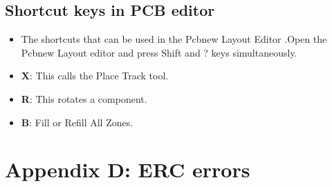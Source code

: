 \subsection{ Shortcut keys in PCB editor}

\begin {itemize}
\item The shortcuts that can be used in the Pcbnew Layout Editor .Open the Pcbnew Layout editor and press Shift and ? keys simultaneously.

\item {\textbf{X}}: This calls the Place Track tool. 
\item {\textbf{R}}: This rotates a component. 
\item{\textbf{B}}: Fill or Refill All Zones. 

\end {itemize}

\section {Appendix D: ERC errors}

